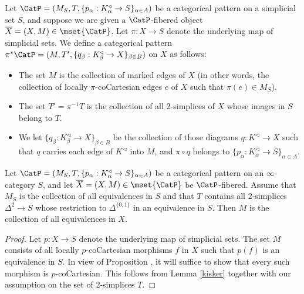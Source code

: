 \begin{notation}
Let $\CatP = (M_S, T, \{ p_{\alpha}: K_{\alpha}^{\triangleleft} \rightarrow S \}_{\alpha \in A})$
be a categorical pattern on a simplicial set $S$, and suppose we are given a 
$\CatP$-fibered object $\overline{X} = (X,M) \in \mset{ \CatP}$. Let $\pi: X \rightarrow S$
denote the underlying map of simplicial sets. We define a categorical pattern
$\pi^{\ast} \CatP = (M, T', \{ q_{\beta}: K_{\beta}^{\triangleleft} \rightarrow X \}_{\beta \in B})$ 
on $X$ as follows:
\begin{itemize}
\item[$(1)$] The set $M$ is the collection of marked edges of $X$ (in other words, the collection
of locally $\pi$-coCartesian edges $e$ of $X$ such that $\pi(e) \in M_S$).
\item[$(2)$] The set $T' = \pi^{-1} T$ is the collection of all $2$-simplices of $X$ whose images in $S$ belong to $T$.
\item[$(3)$] We let $\{ q_{\beta}: K_{\beta}^{\triangleleft} \rightarrow X \}_{\beta \in B}$ be the collection
of those diagrams $q: K^{\triangleleft} \rightarrow X$ such that $q$ carries each edge of
$K^{\triangleleft}$ into $M$, and $\pi \circ q$ belongs to $\{ p_{\alpha}: K_{\alpha}^{\triangleleft} \rightarrow S \}_{\alpha \in A}$.
\end{itemize}
\end{notation}

\begin{lemma}\label{sock}
Let $\CatP = (M_S, T, \{ p_{\alpha}: K_{\alpha}^{\triangleleft} \rightarrow S \}_{\alpha \in A})$
be a categorical pattern on an $\infty$-category $S$, and let $\overline{X} = (X,M) \in \mset{ \CatP}$ be
$\CatP$-fibered. Assume that $M_{S}$ is the collection of all equivalences in $S$ and that $T$ contains
all $2$-simplices $\Delta^2 \rightarrow S$ whose restriction to $\Delta^{ \{0,1\} }$ in an equivalence in $S$. Then $M$ is the collection of all equivalences in $X$.
\end{lemma}

\begin{proof}
Let $p: X \rightarrow S$ denote the underlying map of simplicial sets. The set $M$ consists
of all locally $p$-coCartesian morphisms $f$ in $X$ such that $p(f)$ is an equivalence in $S$.
In view of Proposition , it will suffice to show that every such morphism
is $p$-coCartesian. This follows from Lemma \ref{kisker} together with our assumption on the set of $2$-simplices $T$.
\end{proof}

